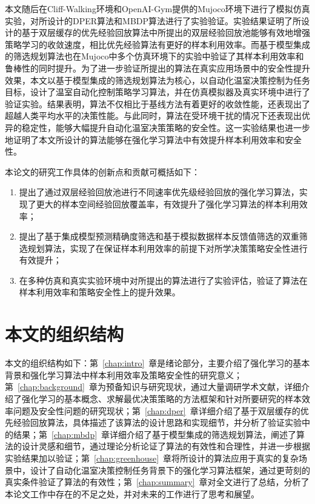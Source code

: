 本文随后在Cliff-Walking环境和OpenAI-Gym提供的Mujoco环境下进行了模拟仿真实验，对所设计的DPER算法和MBDP算法进行了实验验证。实验结果证明了所设计的基于双层缓存的优先经验回放算法中所提出的双层经验回放池能够有效地增强策略学习的收敛速度，相比优先经验算法有更好的样本利用效率。而基于模型集成的筛选规划算法也在Mujoco中多个仿真环境下的实验中验证了其样本利用效率和鲁棒性的同时提升。为了进一步验证所提出的算法在真实应用场景中的安全性提升效果，本文以基于模型集成的筛选规划算法为核心，以自动化温室决策控制为任务目标，设计了温室自动化控制策略学习算法，并在仿真模拟器及真实环境中进行了验证实验。结果表明，算法不仅相比于基线方法有着更好的收敛性能，还表现出了超越人类平均水平的决策性能。与此同时，算法在受环境干扰的情况下还表现出优异的稳定性，能够大幅提升自动化温室决策策略的安全性。这一实验结果也进一步地证明了本文所设计的算法能够在强化学习算法中有效提升样本利用效率和安全性。

本论文的研究工作具体的创新点和贡献可概括如下：

\begin{enumerate}[1)]
    \item 提出了通过双层经验回放池进行不同速率优先级经验回放的强化学习算法，实现了更大的样本空间经验回放覆盖率，有效提升了强化学习算法的样本利用效率；
    \item 提出了基于集成模型预测精确度筛选和基于模拟数据样本反馈值筛选的双重筛选规划算法，实现了在保证样本利用效率的前提下对所学决策策略安全性进行有效提升；
    \item 在多种仿真和真实实验环境中对所提出的算法进行了实验评估，验证了算法在样本利用效率和策略安全性上的提升效果。
\end{enumerate}

\section{本文的组织结构}

本文的组织结构如下：第~\ref{chap:intro}~章是绪论部分，主要介绍了强化学习的基本背景和强化学习算法中样本利用效率及策略安全性的研究意义；第~\ref{chap:background}~章为预备知识与研究现状，通过大量调研学术文献，详细介绍了强化学习的基本概念、求解最优决策策略的方法框架和针对所要研究的样本效率问题及安全性问题的研究现状；第~\ref{chap:dper}~章详细介绍了基于双层缓存的优先经验回放算法，具体描述了该算法的设计思路和实现细节，并分析了验证实验中的结果；第~\ref{chap:mbdp}~章详细介绍了基于模型集成的筛选规划算法，阐述了算法的设计灵感和细节，通过理论分析论证了算法的有效性和合理性，并进一步根据实验结果加以验证；第~\ref{chap:greenhouse}~章将所设计的算法应用于真实的复杂场景中，设计了自动化温室决策控制任务背景下的强化学习算法框架，通过更苛刻的真实条件验证了算法的有效性；第~\ref{chap:summary}~章对全文进行了总结，分析了本论文工作中存在的不足之处，并对未来的工作进行了思考和展望。